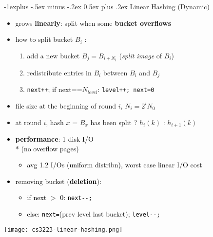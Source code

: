\documentclass[10pt, landscape]{article}
\makeatletter
\renewcommand{\subsection}{\@startsection{subsection}{2}{0mm}%
  {-1explus -.5ex minus -.2ex}%
  {0.5ex plus .2ex}%
{\normalfont\normalsize\bfseries}}
\makeatother
\begin{document}
\begin{multicols*}{4}
  \subsection{Linear Hashing (Dynamic)}

  \begin{itemize}
    \item grows \textbf{linearly}: split when some \textbf{bucket overflows}
    \item how to split bucket $B_i$ :
          \begin{enumerate}
            \item add a new bucket $B_j = B_{i+N_i}$ (\textit{split image} of $B_i$)
            \item redistribute entries in $B_i$ between $B_i$ and $B_j$
            \item \texttt{next++}; if next==$N_{level}$: \texttt{level++; next=0}
          \end{enumerate}
    \item file size at the beginning of round $i$, $N_i = 2^iN_0$
    \item at round $i$, hash $x$ = $B_x$ has been split ? $h_i(k)$ : $h_{i+1}(k)$
  \end{itemize}
  \begin{minipage}[c]{0.6\linewidth}{\textcolor{black}{
        \begin{itemize}
          \item \textbf{performance}: 1 disk I/O \\* (no overflow pages)
                \begin{itemize}
                  \item avg 1.2 I/Os (uniform distribn), worst case linear I/O cost
                \end{itemize}
          \item removing bucket (\textbf{deletion}):
                \begin{itemize}
                  \item if next $>$ 0: \texttt{next-{}-;}
                  \item else: \texttt{next=}(prev level last bucket); \texttt{level-{}-;}
                \end{itemize}
        \end{itemize}
      }}
  \end{minipage}
  \begin{minipage}[c]{0.37\linewidth}
    \texttt{[image: cs3223-linear-hashing.png]}
  \end{minipage}


\end{multicols*}
\end{document}
